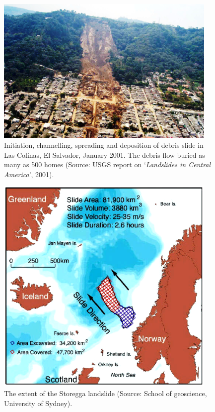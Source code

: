 \begin{figure}[tbhp]
\centering
\includegraphics[width=0.95\textwidth]{Debrisflow}
\caption[Debris slide in Las Colinas, El Salvador, January 2001.]{Initiation, 
channelling, spreading and deposition of debris slide in Las Colinas, El 
Salvador, January 2001. The debris flow buried as many as 500 homes (Source: 
USGS report on `\textit{Landslides in Central America}', 2001).}
\label{fig:debris}
\end{figure}

\begin{figure}[tbhp]
\centering
\includegraphics[width=0.95\textwidth]{Storegga}
\caption[The extent of the Storegga landslide]{The extent of the Storegga 
landslide (Source: School of geoscience, University of Sydney).}
\label{fig:Landslide}
\end{figure}

